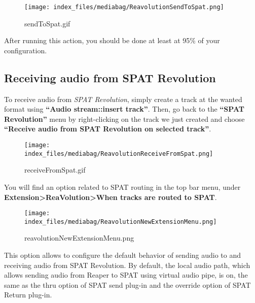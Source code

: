 \documentclass[
  letterpaper,
  DIV=11,
  numbers=noendperiod]{scrreport}
\begin{document}
\begin{figure}

{\centering \texttt{[image: index\_files/mediabag/ReavolutionSendToSpat.png]}

}

\caption{sendToSpat.gif}

\end{figure}

After running this action, you should be done at least at 95\% of your
configuration.

\hypertarget{receiving-audio-from-spat-revolution}{%
\subsection{Receiving audio from SPAT
Revolution}\label{receiving-audio-from-spat-revolution}}

To receive audio from \emph{SPAT Revolution}, simply create a track at
the wanted format using \textbf{``Audio stream::insert track''}. Then,
go back to the \textbf{``SPAT Revolution''} menu by right-clicking on
the track we just created and choose \textbf{``Receive audio from SPAT
Revolution on selected track''}.

\begin{figure}

{\centering \texttt{[image: index\_files/mediabag/ReavolutionReceiveFromSpat.png]}

}

\caption{receiveFromSpat.gif}

\end{figure}

You will find an option related to SPAT routing in the top bar menu,
under \textbf{Extension\textgreater ReaVolution\textgreater When tracks
are routed to SPAT}.

\begin{figure}

{\centering \texttt{[image: index\_files/mediabag/ReavolutionNewExtensionMenu.png]}

}

\caption{reavolutionNewExtensionMenu.png}

\end{figure}

This option allows to configure the default behavior of sending audio to
and receiving audio from SPAT Revolution. By default, the local audio
path, which allows sending audio from Reaper to SPAT using virtual audio
pipe, is on, the same as the thru option of SPAT send plug-in and the
override option of SPAT Return plug-in.
\end{document}
